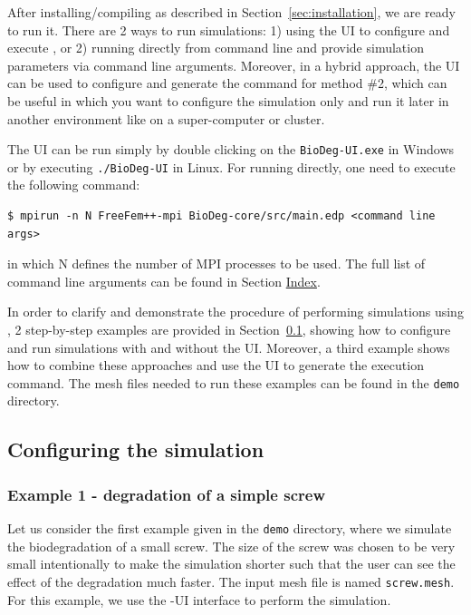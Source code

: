 After installing/compiling \biodeg{} as described in Section~\ref{sec:installation}, we are ready to run it. There are 2 ways to run \biodeg{} simulations: 1) using the UI to configure and execute \biodeg{}, or 2) running \biodeg{} directly from command line and provide simulation parameters via command line arguments. Moreover, in a hybrid approach, the UI can be used to configure and generate the command for method \#2, which can be useful in which you want to configure the simulation only and run it later in another environment like on a super-computer or cluster.

The UI can be run simply by double clicking on the \verb|BioDeg-UI.exe| in Windows or by executing \verb|./BioDeg-UI| in Linux. For running \biodeg{} directly, one need to execute the following command:
\begin{verbatim}
$ mpirun -n N FreeFem++-mpi BioDeg-core/src/main.edp <command line args>
\end{verbatim}
in which N defines the number of MPI processes to be used. The full list of command line arguments can be found in Section \hyperref[sec:index]{Index}.

In order to clarify and demonstrate the procedure of performing simulations using \biodeg{}, 2 step-by-step examples are provided in Section~\ref{sec:config}, showing how to configure and run simulations with and without the UI. Moreover, a third example shows how to combine these approaches and use the UI to generate the execution command. The mesh files needed to run these examples can be found in the \verb|demo| directory.

\subsection{Configuring the simulation} \label{sec:config}


\subsubsection{Example 1 - degradation of a simple screw}\label{sec:example1}

Let us consider the first example given in the \verb|demo| directory, where we simulate the biodegradation of a small screw. The size of the screw was chosen to be very small intentionally to make the simulation shorter such that the user can see the effect of the degradation much faster. The input mesh file is named \verb|screw.mesh|. For this example, we use the \biodeg{}-UI interface to perform the simulation. 


